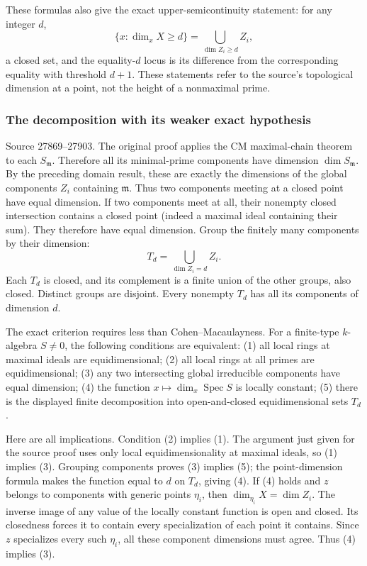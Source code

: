 These formulas also give the exact upper-semicontinuity statement: for any integer \(d\), \[
 \{x:\dim_xX\geq d\}=\bigcup_{\dim Z_i\geq d}Z_i,
\] a closed set, and the equality-\(d\) locus is its difference from the corresponding equality with threshold \(d+1\). These statements refer to the source's topological dimension at a point, not the height of a nonmaximal prime.

\subsubsection{The decomposition with its weaker exact hypothesis}\label{algebra-proof-025-the-decomposition-with-its-weaker-exact-hypothesis}

Source 27869--27903. The original proof applies the CM maximal-chain theorem to each \(S_{\mathfrak m}\). Therefore all its minimal-prime components have dimension \(\dim S_{\mathfrak m}\). By the preceding domain result, these are exactly the dimensions of the global components \(Z_i\) containing \(\mathfrak m\). Thus two components meeting at a closed point have equal dimension. If two components meet at all, their nonempty closed intersection contains a closed point (indeed a maximal ideal containing their sum). They therefore have equal dimension. Group the finitely many components by their dimension: \[
 T_d=\bigcup_{\dim Z_i=d}Z_i.
\] Each \(T_d\) is closed, and its complement is a finite union of the other groups, also closed. Distinct groups are disjoint. Every nonempty \(T_d\) has all its components of dimension \(d\).

The exact criterion requires less than Cohen--Macaulayness. For a finite-type \(k\)-algebra \(S\ne0\), the following conditions are equivalent: (1) all local rings at maximal ideals are equidimensional; (2) all local rings at all primes are equidimensional; (3) any two intersecting global irreducible components have equal dimension; (4) the function \(x\mapsto\dim_x\operatorname{Spec}S\) is locally constant; (5) there is the displayed finite decomposition into open-and-closed equidimensional sets \(T_d\).

Here are all implications. Condition (2) implies (1). The argument just given for the source proof uses only local equidimensionality at maximal ideals, so (1) implies (3). Grouping components proves (3) implies (5); the point-dimension formula makes the function equal to \(d\) on \(T_d\), giving (4). If (4) holds and \(z\) belongs to components with generic points \(\eta_i\), then \(\dim_{\eta_i}X=\dim Z_i\). The inverse image of any value of the locally constant function is open and closed. Its closedness forces it to contain every specialization of each point it contains. Since \(z\) specializes every such \(\eta_i\), all these component dimensions must agree. Thus (4) implies (3).

